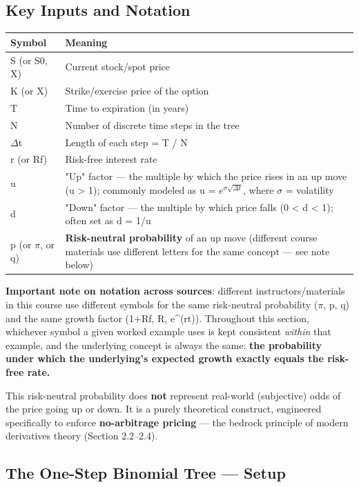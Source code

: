 \documentclass[12pt,openany]{book}
\theoremstyle{definition}
\theoremstyle{remark}
\begin{document}
\subsection{Key Inputs and Notation}

{\small
\begin{longtable}{@{}L{0.28\textwidth}L{0.64\textwidth}@{}}
\toprule
\textbf{Symbol} & \textbf{Meaning} \\
\midrule
S (or S0, X) & Current stock/spot price \\
K (or X) & Strike/exercise price of the option \\
T & Time to expiration (in years) \\
N & Number of discrete time steps in the tree \\
\ensuremath{\Delta}t & Length of each step = T / N \\
r (or Rf) & Risk-free interest rate \\
u & "Up" factor — the multiple by which the price rises in an up move (u > 1); commonly modeled as u = \(e^{\sigma\sqrt{\Delta t}}\), where \ensuremath{\sigma} = volatility \\
d & "Down" factor — the multiple by which price falls (0 < d < 1); often set as d = 1/u \\
p (or \ensuremath{\pi}, or q) & \textbf{Risk-neutral probability} of an up move (different course materials use different letters for the same concept — see note below) \\
\bottomrule
\end{longtable}
}

\textbf{Important note on notation across sources}: different instructors/materials in this course use different symbols for the same risk-neutral probability (\ensuremath{\pi}, p, q) and the same growth factor (1+Rf, R, e\textasciicircum{}(rt)). Throughout this section, whichever symbol a given worked example uses is kept consistent \emph{within} that example, and the underlying concept is always the same: \textbf{the probability under which the underlying's expected growth exactly equals the risk-free rate.}

This risk-neutral probability does \textbf{not} represent real-world (subjective) odds of the price going up or down. It is a purely theoretical construct, engineered specifically to enforce \textbf{no-arbitrage pricing} — the bedrock principle of modern derivatives theory (Section 2.2–2.4).

\subsection{The One-Step Binomial Tree — Setup}
\end{document}
